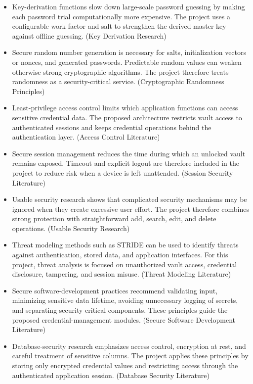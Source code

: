 \documentclass[12pt,a4paper,oneside]{report}
\begin{document}
\begin{itemize}
\item Key-derivation functions slow down large-scale password guessing by making each password trial computationally more expensive. The project uses a configurable work factor and salt to strengthen the derived master key against offline guessing. (Key Derivation Research)
\item Secure random number generation is necessary for salts, initialization vectors or nonces, and generated passwords. Predictable random values can weaken otherwise strong cryptographic algorithms. The project therefore treats randomness as a security-critical service. (Cryptographic Randomness Principles)
\item Least-privilege access control limits which application functions can access sensitive credential data. The proposed architecture restricts vault access to authenticated sessions and keeps credential operations behind the authentication layer. (Access Control Literature)
\item Secure session management reduces the time during which an unlocked vault remains exposed. Timeout and explicit logout are therefore included in the project to reduce risk when a device is left unattended. (Session Security Literature)
\item Usable security research shows that complicated security mechanisms may be ignored when they create excessive user effort. The project therefore combines strong protection with straightforward add, search, edit, and delete operations. (Usable Security Research)
\item Threat modeling methods such as STRIDE can be used to identify threats against authentication, stored data, and application interfaces. For this project, threat analysis is focused on unauthorized vault access, credential disclosure, tampering, and session misuse. (Threat Modeling Literature)
\item Secure software-development practices recommend validating input, minimizing sensitive data lifetime, avoiding unnecessary logging of secrets, and separating security-critical components. These principles guide the proposed credential-management modules. (Secure Software Development Literature)
\item Database-security research emphasizes access control, encryption at rest, and careful treatment of sensitive columns. The project applies these principles by storing only encrypted credential values and restricting access through the authenticated application session. (Database Security Literature)

\end{itemize}
\end{document}

